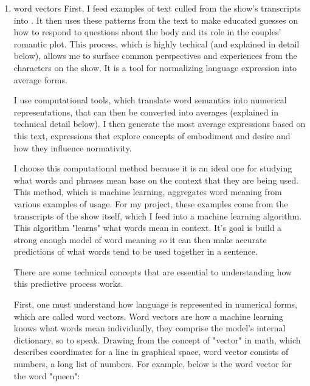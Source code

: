 \documentclass[11pt]{article}
\begin{document}
\begin{enumerate}
And that this experience tells us a lot about what normativity, how
the desire for normative markers, works in perhaps unexpected
intra-social ways (that it creates envy and animosity among cis
groups?). The experience for cis subjects in the pods creates
expectations and disappointments that are actually shared across
identity groups.

\item word vectors
\label{sec:orge846e6e}
First, I feed examples of text culled from the show's transcripts into
.  It then uses these patterns
from the text to make educated guesses on how to respond to questions
about the body and its role in the couples' romantic plot. This
process, which is highly techical (and explained in detail below),
allows me to surface common perspectives and experiences from the
characters on the show. It is a tool for normalizing language
expression into average forms.

I use computational tools, which translate word semantics into
numerical representations, that can then be converted into averages
(explained in technical detail below). I then generate the most
average expressions based on this text, expressions that explore
concepts of embodiment and desire and how they influence normativity.

I choose this computational method because it is an ideal one for
studying what words and phrases mean base on the context that they are
being used. This method, which is machine learning, aggregates word
meaning from various examples of usage. For my project, these examples
come from the transcripts of the show itself, which I feed into a
machine learning algorithm. This algorithm "learns" what words mean in
context. It's goal is build a strong enough model of word meaning so
it can then make accurate predictions of what words tend to be used
together in a sentence.

There are some technical concepts that are essential to understanding
how this predictive process works. 

First, one must understand how language is represented in numerical
forms, which are called word vectors. Word vectors are how a machine
learning knows what words mean individually, they comprise the model's
internal dictionary, so to speak. Drawing from the concept of "vector"
in math, which describes coordinates for a line in graphical space,
word vector consists of numbers, a long list of numbers. For example,
below is the word vector for the word "queen":


\end{enumerate}
\end{document}
